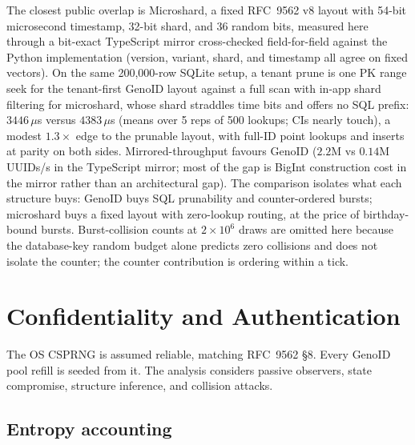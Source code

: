 \documentclass{svproc}
\begin{document}
The closest public overlap is Microshard, a fixed
RFC~9562 v8 layout with 54-bit microsecond timestamp, 32-bit shard, and 36
random bits, measured here through a bit-exact TypeScript mirror
cross-checked field-for-field against the Python implementation (version,
variant, shard, and timestamp all agree on fixed vectors). On the same
200{,}000-row SQLite setup, a tenant prune is one PK range seek for the
tenant-first GenoID layout against a full scan with in-app shard filtering
for microshard, whose shard straddles time bits and offers no SQL prefix:
$3446\,\mu$s versus $4383\,\mu$s (means over 5 reps of 500 lookups; CIs
nearly touch), a modest $1.3\times$ edge to the prunable layout, with full-ID
point lookups and inserts at parity on both sides. Mirrored-throughput favours
GenoID ($2.2$M vs $0.14$M UUIDs/s in the TypeScript mirror; most of the gap is BigInt construction cost in the mirror rather than an architectural gap). The comparison isolates what each structure buys: GenoID
buys SQL prunability and counter-ordered bursts; microshard buys a fixed
layout with zero-lookup routing, at the price of birthday-bound bursts. Burst-collision counts at $2\times10^6$ draws are omitted here because the database-key random budget alone predicts zero collisions and does not isolate the counter; the counter contribution is ordering within a tick.

\section{Confidentiality and Authentication}
\label{sec:security}

The OS CSPRNG is assumed reliable, matching RFC~9562 \S8. Every GenoID pool refill is seeded from it. The analysis considers passive observers, state compromise, structure inference, and collision attacks.

\subsection{Entropy accounting}
\label{sec:entropy-accounting}
\end{document}
